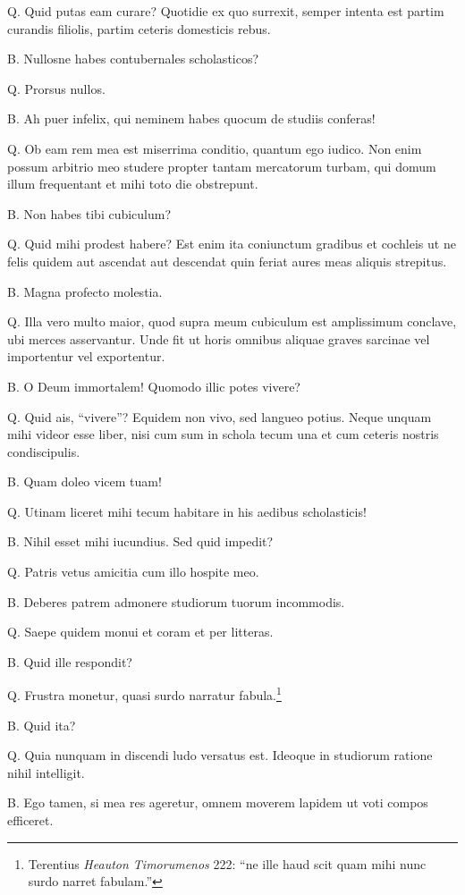 \documentclass{article}
\begin{document}
Q. Quid putas eam curare? Quotidie ex quo surrexit, semper intenta est partim curandis filiolis, partim ceteris domesticis rebus.

B. Nullosne habes contubernales scholasticos?

Q. Prorsus nullos.

B. Ah puer infelix, qui neminem habes quocum de studiis conferas!

Q. Ob eam rem mea est miserrima conditio, quantum ego iudico. Non enim possum arbitrio meo studere propter tantam mercatorum turbam, qui domum illum frequentant et mihi toto die obstrepunt.

B. Non habes tibi cubiculum?

Q. Quid mihi prodest habere? Est enim ita coniunctum gradibus et cochleis ut ne felis quidem aut ascendat aut descendat quin feriat aures meas aliquis strepitus.

B. Magna profecto molestia.

Q. Illa vero multo maior, quod supra meum cubiculum est amplissimum conclave, ubi merces asservantur. Unde fit ut horis omnibus aliquae graves sarcinae vel importentur vel exportentur.

B. O Deum immortalem! Quomodo illic potes vivere?

Q. Quid ais, ``vivere''? Equidem non vivo, sed langueo potius. Neque unquam mihi videor esse liber, nisi cum sum in schola tecum una et cum ceteris nostris condiscipulis.

B. Quam doleo vicem tuam!

Q. Utinam liceret mihi tecum habitare in his aedibus scholasticis!

B. Nihil esset mihi iucundius. Sed quid impedit?

Q. Patris vetus amicitia cum illo hospite meo.

B. Deberes patrem admonere studiorum tuorum incommodis.

Q. Saepe quidem monui et coram et per litteras.

B. Quid ille respondit?

Q. Frustra monetur, quasi surdo narratur fabula.\footnote{Terentius \emph{Heauton Timorumenos} 222: ``ne ille haud scit quam mihi nunc surdo narret fabulam.''}

B. Quid ita?

Q. Quia nunquam in discendi ludo versatus est. Ideoque in studiorum ratione nihil intelligit.

B. Ego tamen, si mea res ageretur, omnem moverem lapidem ut voti compos efficeret.
\end{document}
